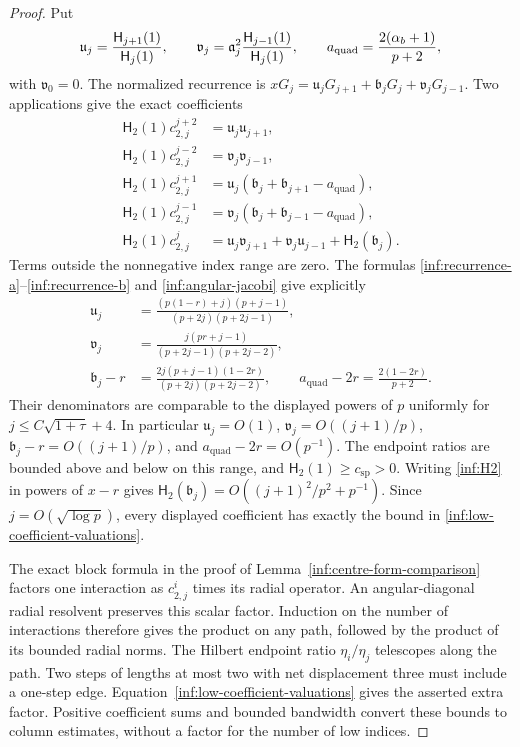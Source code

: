 \begin{proof}
Put
\[
 \mathfrak u_j=\frac{\mathsf H_{j+1}(1)}{\mathsf H_j(1)},\qquad
 \mathfrak v_j=\mathfrak a_j^2
              \frac{\mathsf H_{j-1}(1)}{\mathsf H_j(1)},\qquad
 a_{\mathrm{quad}}=\frac{2(\alpha_b+1)}{p+2},
\]
with $\mathfrak v_0=0$. The normalized recurrence is
$xG_j=\mathfrak u_jG_{j+1}+\mathfrak b_jG_j+\mathfrak v_jG_{j-1}$.
Two applications give the exact coefficients
\begin{align*}
 \mathsf H_2(1)c_{2,j}^{j+2}&=\mathfrak u_j\mathfrak u_{j+1},\\
 \mathsf H_2(1)c_{2,j}^{j-2}&=\mathfrak v_j\mathfrak v_{j-1},\\
 \mathsf H_2(1)c_{2,j}^{j+1}
 &=\mathfrak u_j(\mathfrak b_j+\mathfrak b_{j+1}-a_{\mathrm{quad}}),\\
 \mathsf H_2(1)c_{2,j}^{j-1}
 &=\mathfrak v_j(\mathfrak b_j+\mathfrak b_{j-1}-a_{\mathrm{quad}}),\\
 \mathsf H_2(1)c_{2,j}^{j}
 &=\mathfrak u_j\mathfrak v_{j+1}+\mathfrak v_j\mathfrak u_{j-1}
                                      +\mathsf H_2(\mathfrak b_j).
\end{align*}
Terms outside the nonnegative index range are zero.
The formulas \eqref{inf:recurrence-a}--\eqref{inf:recurrence-b}
and \eqref{inf:angular-jacobi} give explicitly
\begin{align*}
 \mathfrak u_j&=\frac{(p(1-r)+j)(p+j-1)}{(p+2j)(p+2j-1)},\\
 \mathfrak v_j&=\frac{j(pr+j-1)}{(p+2j-1)(p+2j-2)},\\
 \mathfrak b_j-r&=\frac{2j(p+j-1)(1-2r)}{(p+2j)(p+2j-2)},
 \qquad a_{\mathrm{quad}}-2r=\frac{2(1-2r)}{p+2}.
\end{align*}
Their denominators are comparable to the displayed powers of $p$
uniformly for $j\le C\sqrt{1+\tau}+4$. In particular
$\mathfrak u_j=O(1)$, $\mathfrak v_j=O((j+1)/p)$,
$\mathfrak b_j-r=O((j+1)/p)$, and $a_{\mathrm{quad}}-2r=O(p^{-1})$.
The endpoint ratios are bounded above and below on this range,
and $\mathsf H_2(1)\ge c_{\mathrm{sp}}>0$.
Writing \eqref{inf:H2} in powers of $x-r$ gives
$\mathsf H_2(\mathfrak b_j)=O((j+1)^2/p^2+p^{-1})$.
Since $j=O(\sqrt{\log p})$, every displayed coefficient has exactly
the bound in \eqref{inf:low-coefficient-valuations}.

The exact block formula in the proof of
Lemma~\ref{inf:centre-form-comparison} factors one interaction as
$c_{2,j}^i$ times its radial operator. An angular-diagonal radial
resolvent preserves this scalar factor. Induction on the number
of interactions therefore gives the product on any path, followed
by the product of its bounded radial norms. The Hilbert endpoint
ratio $\eta_i/\eta_j$ telescopes along the path.
Two steps of lengths at most two with net displacement three
must include a one-step edge. Equation~\eqref{inf:low-coefficient-valuations}
gives the asserted extra factor. Positive coefficient sums and
bounded bandwidth convert these bounds to column estimates,
without a factor for the number of low indices.
\end{proof}

